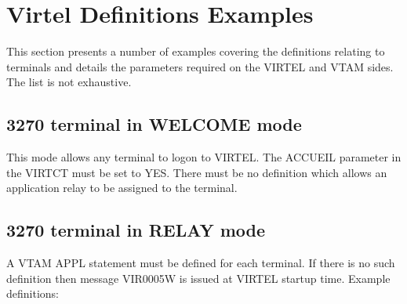 \documentclass[letterpaper,10pt,english]{sphinxmanual}
\begin{document}
\begin{sphinxVerbatim}[commandchars=\\\{\}]
      

            
                
         
              
                            
 
                  
\end{sphinxVerbatim}


\chapter{Virtel Definitions Examples}
\label{\detokenize{connectivity_guide:virtel-definitions-examples}}
This section presents a number of examples covering the definitions relating to terminals and details the parameters required on the VIRTEL and VTAM sides. The list is not exhaustive.


\section{3270 terminal in WELCOME mode}
\label{\detokenize{connectivity_guide:terminal-in-welcome-mode}}
This mode allows any terminal to logon to VIRTEL. The ACCUEIL parameter in the VIRTCT must be set to YES. There must be no definition which allows an application relay to be assigned to the terminal.


\section{3270 terminal in RELAY mode}
\label{\detokenize{connectivity_guide:terminal-in-relay-mode}}
A VTAM APPL statement must be defined for each terminal. If there is no such definition then message VIR0005W is issued at VIRTEL startup time. Example definitions:
\end{document}
